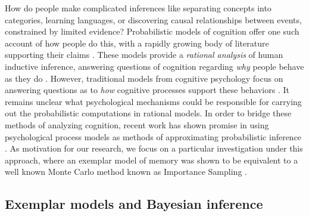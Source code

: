 \documentclass[10pt,letterpaper]{article}
\begin{document}
How do people make complicated inferences like separating concepts into categories, learning languages, or discovering causal relationships between events, constrained by limited evidence? Probabilistic models of cognition offer one such account of how people do this, with a rapidly growing body of literature supporting their claims \cite{griffiths2010probabilistic,tenenbaum2011grow}. These models provide a \textit{rational analysis} of human inductive inference, answering questions of cognition regarding \textit{why} people behave as they do \cite{marr82,anderson90}. However, traditional models from cognitive psychology focus on answering questions as to \textit{how} cognitive processes support these behaviors \cite{kahneman1972subjective,medin1978context,gigerenzer2000simple}. It remains unclear what psychological mechanisms could be responsible for carrying out the probabilistic computations in rational models. In order to bridge these methods of analyzing cognition, recent work has shown promise in using psychological process models as methods of approximating probabilistic inference \cite{sanborn2010rational,griffiths2012bridging}. As motivation for our research, we focus on a particular investigation under this approach, where an exemplar model of memory was shown to be equivalent to a well known Monte Carlo method known as Importance Sampling \cite{Shi2010}.

\subsection{Exemplar models and Bayesian inference}



\end{document}
